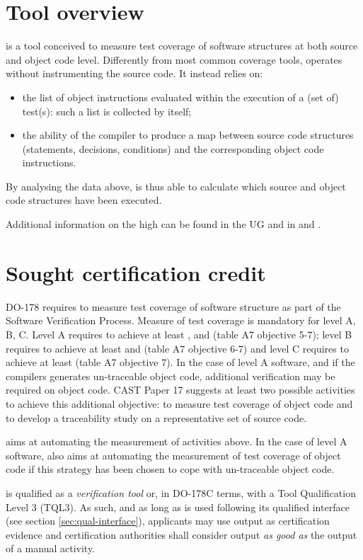 \documentclass {report}
\begin{document}
\section{Tool overview}
\xcov is a tool conceived to measure test coverage of software structures at both source and object code level. Differently from most common coverage tools, \xcov operates without instrumenting the source code. It instead relies on:
\begin{itemize}
\item the list of object instructions evaluated within the execution of a (set of) test(s): such a list is collected by \xcov itself; 
\item the ability of the compiler to produce a map between source code structures (statements, decisions, conditions) and the corresponding object code instructions.
\end{itemize}
By analysing the data above, \xcov is thus able to calculate which source and object code structures have been executed.

Additional information on the high \xcov can be found in the \xcov UG and in \adaeurope and \erts.

\section {Sought certification credit}
DO-178 requires to measure test coverage of software structure as part of the Software Verification Process. Measure of test coverage is mandatory for level A, B, C. Level A requires to achieve at least \mcdc, \dc and \stc (table A7 objective 5-7); level B requires to achieve at least \dc and \stc (table A7 objective 6-7) and level C requires to achieve at least \stc (table A7 objective 7). In the case of level A software, and if the compilers generates un-traceable object code, additional verification may be required on object code. CAST Paper 17 suggests at least two possible activities to achieve this additional objective: to measure test coverage of object code and to develop a traceability study on a representative set of source code.

\xcov aims at automating the measurement of activities above. In the case of level A software, \xcov also aims at automating the measurement of test coverage of object code if this strategy has been chosen to cope with un-traceable object code.

\xcov is qualified as a \emph{verification tool} or, in DO-178C terms, with a Tool Qualification Level 3 (TQL3). As such, and as long as \xcov is used following its qualified interface (see section \ref{sec:qual-interface}), applicants may use \xcov output as certification evidence and certification authorities shall consider \xcov output \emph{as good as} the output of a manual activity.
\end{document}
